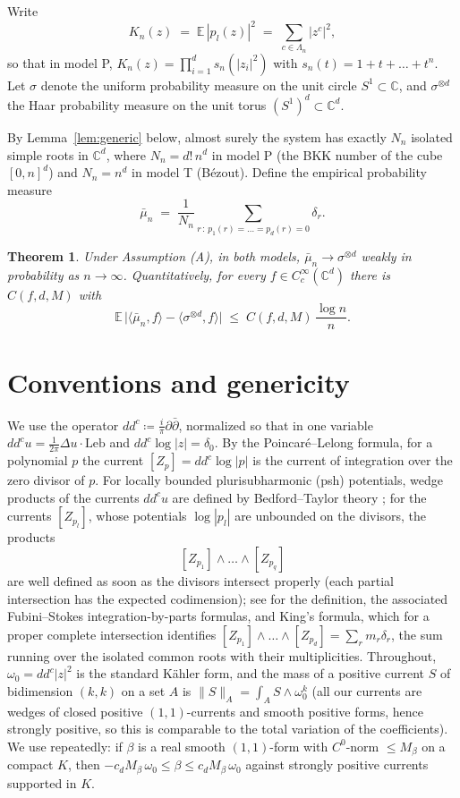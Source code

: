 \documentclass[12pt]{article}
\def\C{\mathbb{C}}
\def\E{\mathbb{E}}
\def\ddc{dd^c}
\newtheorem{theorem}{Theorem}[section]
\begin{document}
\medskip
Write
\[
  K_n(z) \;=\; \E\,|p_l(z)|^2 \;=\; \sum_{c\in\Lambda_n} |z^c|^2,
\]
so that in model P, $K_n(z) = \prod_{i=1}^d s_n(|z_i|^2)$ with
$s_n(t) = 1 + t + \dots + t^n$. Let $\sigma$ denote the uniform probability measure on
the unit circle $S^1 \subset \C$, and $\sigma^{\otimes d}$ the Haar probability measure
on the unit torus $(S^1)^d \subset \C^d$.

By Lemma~\ref{lem:generic} below, almost surely the system has exactly $N_n$ isolated
simple roots in $\C^d$, where $N_n = d!\,n^d$ in model P (the BKK number of the cube
$[0,n]^d$) and $N_n = n^d$ in model T (B\'ezout). Define the empirical probability
measure
\[
  \bar\mu_n \;=\; \frac{1}{N_n} \sum_{r \,:\, p_1(r)=\dots=p_d(r)=0} \delta_r .
\]

\begin{theorem}\label{thm:main}
Under Assumption (A), in both models, $\bar\mu_n \to \sigma^{\otimes d}$ weakly in
probability as $n \to \infty$. Quantitatively, for every $f \in C^\infty_c(\C^d)$ there
is $C(f,d,M)$ with
\[
  \E\,\bigl|\langle \bar\mu_n , f\rangle - \langle \sigma^{\otimes d}, f\rangle\bigr|
  \;\le\; C(f,d,M)\,\frac{\log n}{n}.
\]
\end{theorem}

\section{Conventions and genericity}

We use the operator $\ddc \coloneqq \frac{i}{\pi}\partial\bar\partial$, normalized so
that in one variable $\ddc u = \frac{1}{2\pi}\Delta u \cdot \mathrm{Leb}$ and
$\ddc \log|z| = \delta_0$. By the Poincar\'e--Lelong formula, for a polynomial $p$ the
current $[Z_p] = \ddc \log|p|$ is the current of integration over the zero divisor of
$p$. For locally bounded plurisubharmonic (psh) potentials, wedge products of the
currents $\ddc u$ are defined by Bedford--Taylor theory \cite{BT82}; for the currents
$[Z_{p_l}]$, whose potentials $\log|p_l|$ are unbounded on the divisors, the products
\[
  [Z_{p_1}] \wedge \dots \wedge [Z_{p_q}]
\]
are well defined as soon as the divisors intersect properly (each partial intersection
has the expected codimension); see \cite[Ch.~III, \S3--4]{Dem} for the definition, the
associated Fubini--Stokes integration-by-parts formulas, and King's formula, which for a
proper complete intersection identifies
$[Z_{p_1}]\wedge\dots\wedge[Z_{p_d}] = \sum_r m_r \delta_r$, the sum running over the
isolated common roots with their multiplicities. Throughout, $\omega_0 = \ddc |z|^2$ is
the standard K\"ahler form, and the mass of a positive current $S$ of bidimension
$(k,k)$ on a set $A$ is $\|S\|_A = \int_A S \wedge \omega_0^{k}$ (all our currents are
wedges of closed positive $(1,1)$-currents and smooth positive forms, hence strongly
positive, so this is comparable to the total variation of the coefficients). We use
repeatedly: if $\beta$ is a real smooth $(1,1)$-form with $C^0$-norm $\le M_\beta$ on a
compact $K$, then $-c_d M_\beta\, \omega_0 \le \beta \le c_d M_\beta\, \omega_0$ against
strongly positive currents supported in $K$.
\end{document}
